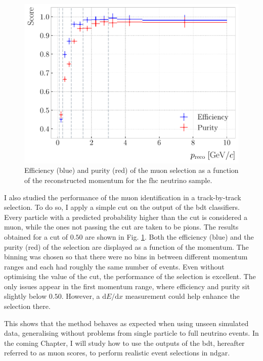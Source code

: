 \begin{figure}[t]
	\centering
	\includegraphics[width=.75\linewidth]{Images/GArSoft_PID/BDT/ecal_bdt_validation_momentum.pdf}
	\caption[Efficiency and purity of the muon selection as a function of the reconstructed momentum for the \gls{fhc} neutrino sample.]{Efficiency (blue) and purity (red) of the muon selection as a function of the reconstructed momentum for the \gls{fhc} neutrino sample.}
	\label{fig:bdt_validation_output}
\end{figure}

I also studied the performance of the muon identification in a track-by-track selection. To do so, I apply a simple cut on the output of the \gls{bdt} classifiers. Every particle with a predicted probability higher than the cut is considered a muon, while the ones not passing the cut are taken to be pions. The results obtained for a cut of $0.50$ are shown in Fig. \ref{fig:bdt_validation_output}. Both the efficiency (blue) and the purity (red) of the selection are displayed as a function of the momentum. The binning was chosen so that there were no bins in between different momentum ranges and each had roughly the same number of events. Even without optimising the value of the cut, the performance of the selection is excellent. The only issues appear in the first momentum range, where efficiency and purity sit slightly below $0.50$. However, a $\mathrm{d}E/\mathrm{d}x$ measurement could help enhance the selection there.

This shows that the method behaves as expected when using unseen simulated data, generalising without problems from single particle to full neutrino events. In the coming Chapter, I will study how to use the outputs of the \gls{bdt}, hereafter referred to as muon scores, to perform realistic event selections in \gls{ndgar}.


